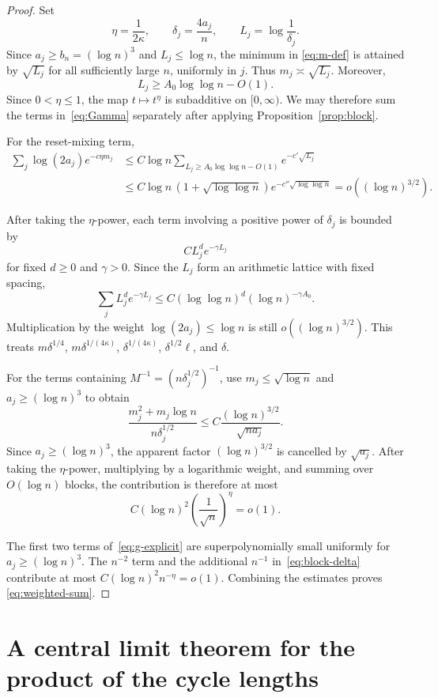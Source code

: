 \documentclass[11pt]{article}
\theoremstyle{remark}
\begin{document}
\begin{proof}
Set
\[
 \eta=\frac1{2\kappa},
 \qquad
 \delta_j=\frac{4a_j}{n},
 \qquad
 L_j=\log\frac1{\delta_j}.
\]
Since $a_j\geq b_n=(\log n)^3$ and $L_j\leq\log n$, the minimum in
\eqref{eq:m-def} is attained by $\sqrt{L_j}$ for all sufficiently large
$n$, uniformly in $j$.  Thus $m_j\asymp\sqrt{L_j}$.  Moreover,
\[
 L_j\geq A_0\log\log n-O(1).
\]
Since $0<\eta\leq1$, the map $t\mapsto t^\eta$ is subadditive on
$[0,\infty)$.  We may therefore sum the terms in~\eqref{eq:Gamma}
separately after applying Proposition~\ref{prop:block}.

For the reset-mixing term,
\begin{align*}
 \sum_j\log(2a_j)e^{-c\eta m_j}
 &\leq C\log n\sum_{L_j\geq A_0\log\log n-O(1)}e^{-c'\sqrt{L_j}}\\
 &\leq C\log n\,(1+\sqrt{\log\log n})
 e^{-c''\sqrt{\log\log n}}
 =o((\log n)^{3/2}).
\end{align*}

After taking the $\eta$-power, each term involving a positive power of
$\delta_j$ is bounded by
\[
 C L_j^d e^{-\gamma L_j}
\]
for fixed $d\geq0$ and $\gamma>0$.  Since the $L_j$ form an arithmetic
lattice with fixed spacing,
\[
 \sum_j L_j^d e^{-\gamma L_j}
 \leq C(\log\log n)^d(\log n)^{-\gamma A_0}.
\]
Multiplication by the weight $\log(2a_j)\leq\log n$ is still
$o((\log n)^{3/2})$.  This treats
$m\delta^{1/4}$, $m\delta^{1/(4\kappa)}$,
$\delta^{1/(4\kappa)}$, $\delta^{1/2}\ell$, and $\delta$.

For the terms containing $M^{-1}=(n\delta_j^{1/2})^{-1}$, use
$m_j\leq\sqrt{\log n}$ and $a_j\geq(\log n)^3$ to obtain
\[
 \frac{m_j^2+m_j\log n}{n\delta_j^{1/2}}
 \leq C\frac{(\log n)^{3/2}}{\sqrt{na_j}}.
\]
Since $a_j\geq(\log n)^3$, the apparent factor
$(\log n)^{3/2}$ is cancelled by $\sqrt{a_j}$.  After taking the
$\eta$-power, multiplying by a logarithmic weight, and summing over
$O(\log n)$ blocks, the contribution is therefore at most
\[
 C(\log n)^2
 \left(\frac1{\sqrt n}\right)^\eta=o(1).
\]

The first two terms of~\eqref{eq:g-explicit} are superpolynomially small
uniformly for $a_j\geq(\log n)^3$.  The $n^{-2}$ term and the additional
$n^{-1}$ in~\eqref{eq:block-delta} contribute at most
$C(\log n)^2n^{-\eta}=o(1)$.  Combining the estimates proves
\eqref{eq:weighted-sum}.
\end{proof}

\section{A central limit theorem for the product of the cycle lengths}
\end{document}
